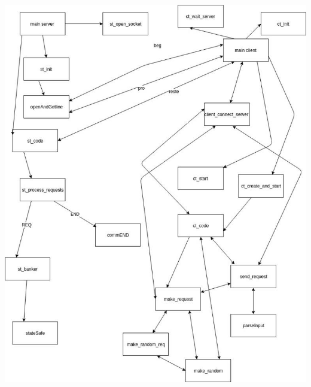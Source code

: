 \documentclass[11pt]{article}
\begin{document}
\includegraphics[width=\textwidth,height=\textheight,keepaspectratio]{CLIENTEtSERVER}





\end{document}
